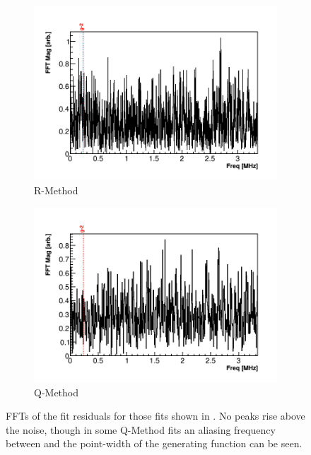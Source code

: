\begin{figure}
    \begin{subfigure}[t]{0.45\textwidth}
        \centering
        \includegraphics[width=\textwidth]{FFT_RMethod}
        \caption{R-Method}
    \end{subfigure}
    \hspace{1mm}
    \begin{subfigure}[t]{0.45\textwidth}
        \centering
        \includegraphics[width=\textwidth]{FFT_QMethod}
        \caption{Q-Method}
    \end{subfigure}
\caption[]{FFTs of the fit residuals for those fits shown in . No peaks rise above the noise, though in some Q-Method fits an aliasing frequency between \gmtwo and the point-width of the generating function can be seen.}
\label{fig:FFTs}
\end{figure}


